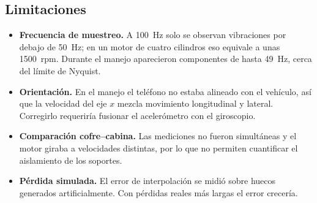 \subsection{Limitaciones}

\begin{itemize}
  \item \textbf{Frecuencia de muestreo.} A 100~Hz solo se observan vibraciones por debajo de 50~Hz; en un motor de cuatro cilindros eso equivale a unas 1500~rpm. Durante el manejo aparecieron componentes de hasta 49~Hz, cerca del límite de Nyquist.
  \item \textbf{Orientación.} En el manejo el teléfono no estaba alineado con el vehículo, así que la velocidad del eje $x$ mezcla movimiento longitudinal y lateral. Corregirlo requeriría fusionar el acelerómetro con el giroscopio.
  \item \textbf{Comparación cofre--cabina.} Las mediciones no fueron simultáneas y el motor giraba a velocidades distintas, por lo que no permiten cuantificar el aislamiento de los soportes.
  \item \textbf{Pérdida simulada.} El error de interpolación se midió sobre huecos generados artificialmente. Con pérdidas reales más largas el error crecería.
\end{itemize}
